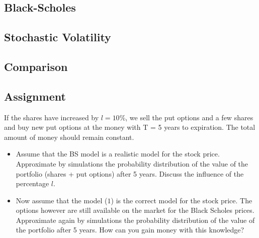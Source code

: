 \documentclass[11pt]{article}
\begin{document}
\subsection{Black-Scholes}

\subsection{Stochastic Volatility}

\subsection{Comparison}


\subsection{Assignment}
If the shares have increased by $l = 10$\%, we sell the put options and a few
shares and buy new put options at the money with T = 5 years to expiration.
The total amount of money should remain constant.

\begin{itemize}
\item
Assume that the BS model is a realistic model for the stock price. Approximate
by simulations the probability distribution of the value of the portfolio
(shares + put options) after 5 years. Discuss the influence of the percentage
$l$.
\item
Now assume that the model ($1$) is the correct model for the stock price. The
options however are still available on the market for the Black Scholes
prices. Approximate again by simulations the probability distribution of the
value of the portfolio after 5 years. How can you gain money with this
knowledge?
\end{itemize}
\end{document}
